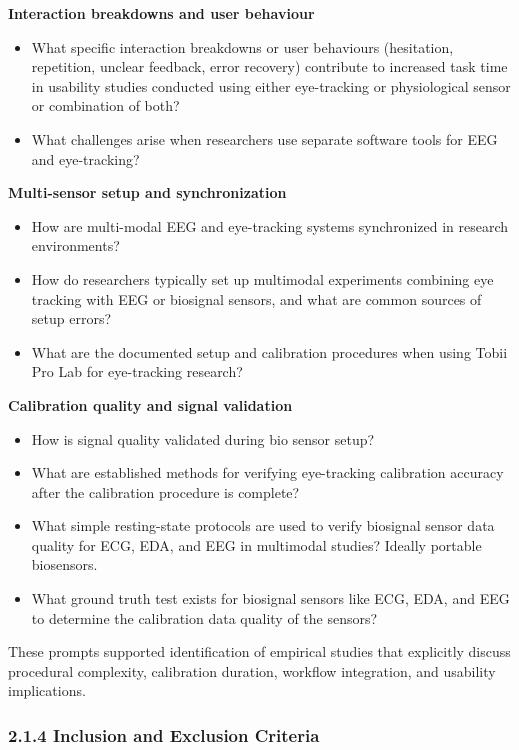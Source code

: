 \documentclass[
]{article}
\begin{document}
\textbf{Interaction breakdowns and user behaviour}

\begin{itemize}
\item
  What specific interaction breakdowns or user behaviours (hesitation, repetition, unclear feedback, error recovery) contribute to increased task time in usability studies conducted using either eye-tracking or physiological sensor or combination of both?
\item
  What challenges arise when researchers use separate software tools for EEG and eye-tracking?
\end{itemize}

\textbf{Multi-sensor setup and synchronization}

\begin{itemize}
\item
  How are multi-modal EEG and eye-tracking systems synchronized in research environments?
\item
  How do researchers typically set up multimodal experiments combining eye tracking with EEG or biosignal sensors, and what are common sources of setup errors?
\item
  What are the documented setup and calibration procedures when using Tobii Pro Lab for eye-tracking research?
\end{itemize}

\textbf{Calibration quality and signal validation}

\begin{itemize}
\item
  How is signal quality validated during bio sensor setup?
\item
  What are established methods for verifying eye-tracking calibration accuracy after the calibration procedure is complete?
\item
  What simple resting-state protocols are used to verify biosignal sensor data quality for ECG, EDA, and EEG in multimodal studies? Ideally portable biosensors.
\item
  What ground truth test exists for biosignal sensors like ECG, EDA, and EEG to determine the calibration data quality of the sensors?
\end{itemize}

These prompts supported identification of empirical studies that explicitly discuss procedural complexity, calibration duration, workflow integration, and usability implications.

\hypertarget{inclusion-and-exclusion-criteria}{%
\subsubsection{2.1.4 Inclusion and Exclusion Criteria}\label{inclusion-and-exclusion-criteria}}
\end{document}
